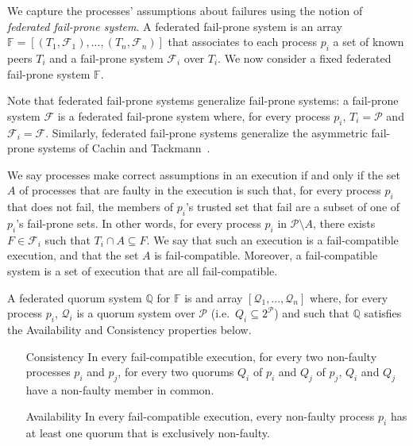 \documentclass[11pt,letterpaper]{article}
\begin{document}
We capture the processes' assumptions about failures using the notion of \emph{federated fail-prone system}.
A federated fail-prone system is an array $\mathbb{F}=\left[\left(T_1,\mathcal{F}_1\right),...,\left(T_n,\mathcal{F}_n\right)\right]$ that associates to each process $p_i$ a set of known peers $T_i$ and a fail-prone system $\mathcal{F}_i$ over $T_i$.
We now consider a fixed federated fail-prone system $\mathbb{F}$.

Note that federated fail-prone systems generalize fail-prone systems: a fail-prone system $\mathcal{F}$ is a federated fail-prone system where, for every process $p_i$, $T_i=\mathcal{P}$ and $\mathcal{F}_i=\mathcal{F}$. Similarly, federated fail-prone systems generalize the asymmetric fail-prone systems of Cachin and Tackmann~\cite{cachinAsymmetricDistributedTrust2019}.

We say processes make correct assumptions in an execution if and only if the set $A$ of processes that are faulty in the execution is such that, for every process $p_i$ that does not fail, the members of $p_i$'s trusted set that fail are a subset of one of $p_i$'s fail-prone sets.
In other words, for every process $p_i$ in $\mathcal{P}\setminus A$, there exists $F\in\mathcal{F}_i$ such that $T_i\cap A \subseteq F$.
We say that such an execution is a fail-compatible execution, and that the set $A$ is fail-compatible.
Moreover, a fail-compatible system is a set of execution that are all fail-compatible.

A federated quorum system $\mathbb{Q}$ for $\mathbb{F}$ is and array $\left[\mathcal{Q}_1,...,\mathcal{Q}_n\right]$ where, for every process $p_i$, $\mathcal{Q}_i$ is a quorum system over $\mathcal{P}$ (i.e.\ $Q_i\subseteq 2^{\mathcal{P}}$) and such that $\mathbb{Q}$ satisfies the Availability and Consistency properties below.
\begin{itemize}
  \item[Consistency] In every fail-compatible execution, for every two non-faulty processes $p_i$ and $p_j$, for every two quorums $Q_i$ of $p_i$ and $Q_j$ of $p_j$, $Q_i$ and $Q_j$ have a non-faulty member in common.
  \item[Availability] In every fail-compatible execution, every non-faulty process $p_i$  has at least one quorum that is exclusively non-faulty.
\end{itemize}
\end{document}
